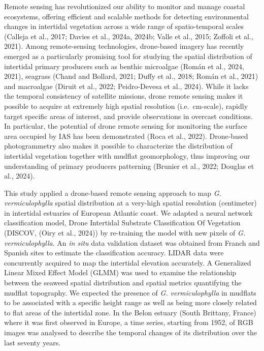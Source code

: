 \documentclass[
  letterpaper,
  DIV=11,
  numbers=noendperiod]{scrartcl}
\begin{document}
Remote sensing has revolutionized our ability to monitor and manage
coastal ecosystems, offering efficient and scalable methods for
detecting environmental changes in intertidal vegetation across a wide
range of spatio-temporal scales (Calleja et al., 2017; Davies et al.,
2024a, 2024b; Valle et al., 2015; Zoffoli et al., 2021). Among
remote-sensing technologies, drone-based imagery has recently emerged as
a particularly promising tool for studying the spatial distribution of
intertidal primary producers such as benthic microalgae (Román et al.,
2024, 2021), seagrass (Chand and Bollard, 2021; Duffy et al., 2018;
Román et al., 2021) and macroalgae (Diruit et al., 2022; Peidro-Devesa
et al., 2024). While it lacks the temporal consistency of satellite
missions, drone remote sensing makes it possible to acquire at extremely
high spatial resolution (i.e.~cm-scale), rapidly target specific areas
of interest, and provide observations in overcast conditions. In
particular, the potential of drone remote sensing for monitoring the
surface area occupied by IAS has been demonstrated (Roca et al., 2022).
Drone-based photogrammetry also makes it possible to characterize the
distribution of intertidal vegetation together with mudflat
geomorphology, thus improving our understanding of primary producers
patterning (Brunier et al., 2022; Douglas et al., 2024).

This study applied a drone-based remote sensing approach to map \emph{G.
vermiculophylla} spatial distribution at a very-high spatial resolution
(centimeter) in intertidal estuaries of European Atlantic coast. We
adapted a neural network classification model, Drone Intertidal
Substrate Classification Of Vegetation (DISCOV, (Oiry et al., 2024)) by
re-training the model with new pixels of \emph{G. vermiculophylla}. An
\emph{in situ} data validation dataset was obtained from Franch and
Spanish sites to estimate the classification accuracy. LIDAR data were
concurrently acquired to map the intertidal elevation accurately. A
Generalized Linear Mixed Effect Model (GLMM) was used to examine the
relationship between the seaweed spatial distribution and spatial
metrics quantifying the mudflat topography. We expected the presence of
\emph{G. vermiculophylla} in mudflats to be associated with a specific
height range as well as being more closely related to flat areas of the
intertidal zone. In the Belon estuary (South Brittany, France) where it
was first observed in Europe, a time series, starting from 1952, of RGB
images was analysed to describe the temporal changes of its distribution
over the last seventy years.
\end{document}
